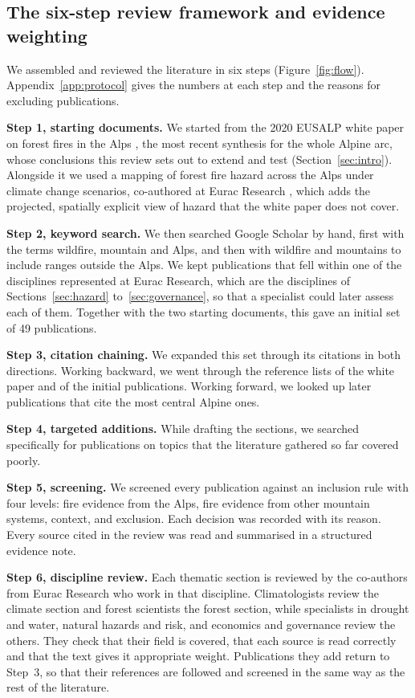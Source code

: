 \documentclass[11pt,a4paper]{article}
\begin{document}
\subsection{The six-step review framework and evidence weighting}

We assembled and reviewed the literature in six steps (Figure~\ref{fig:flow}). Appendix~\ref{app:protocol} gives the numbers at each step and the reasons for excluding publications.

\textbf{Step 1, starting documents.} We started from the 2020 EUSALP white paper on forest fires in the Alps \citep{muller_forest_2020}, the most recent synthesis for the whole Alpine arc, whose conclusions this review sets out to extend and test (Section~\ref{sec:intro}). Alongside it we used a mapping of forest fire hazard across the Alps under climate change scenarios, co-authored at Eurac Research \citep{gerberding_mapping_2025}, which adds the projected, spatially explicit view of hazard that the white paper does not cover.

\textbf{Step 2, keyword search.} We then searched Google Scholar by hand, first with the terms wildfire, mountain and Alps, and then with wildfire and mountains to include ranges outside the Alps. We kept publications that fell within one of the disciplines represented at Eurac Research, which are the disciplines of Sections~\ref{sec:hazard} to~\ref{sec:governance}, so that a specialist could later assess each of them. Together with the two starting documents, this gave an initial set of 49 publications.

\textbf{Step 3, citation chaining.} We expanded this set through its citations in both directions. Working backward, we went through the reference lists of the white paper and of the initial publications. Working forward, we looked up later publications that cite the most central Alpine ones.

\textbf{Step 4, targeted additions.} While drafting the sections, we searched specifically for publications on topics that the literature gathered so far covered poorly.

\textbf{Step 5, screening.} We screened every publication against an inclusion rule with four levels: fire evidence from the Alps, fire evidence from other mountain systems, context, and exclusion. Each decision was recorded with its reason. Every source cited in the review was read and summarised in a structured evidence note.

\textbf{Step 6, discipline review.} Each thematic section is reviewed by the co-authors from Eurac Research who work in that discipline. Climatologists review the climate section and forest scientists the forest section, while specialists in drought and water, natural hazards and risk, and economics and governance review the others. They check that their field is covered, that each source is read correctly and that the text gives it appropriate weight. Publications they add return to Step~3, so that their references are followed and screened in the same way as the rest of the literature.
\end{document}
